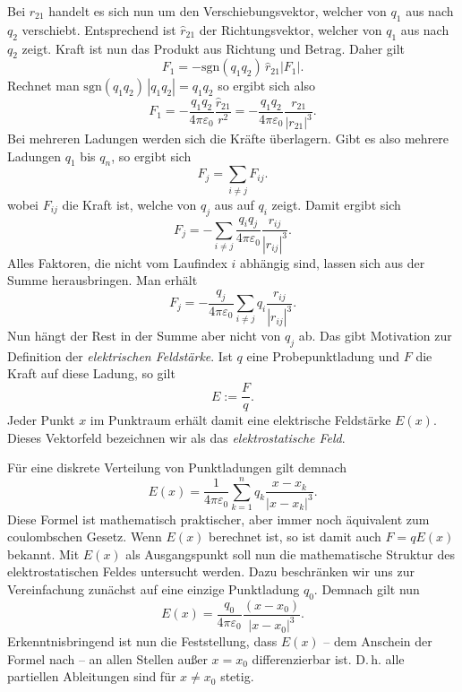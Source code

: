 \documentclass[a4paper,10pt,fleqn,twocolumn,twoside]{article}
\begin{document}
Bei $r_{21}$ handelt es sich nun um den Verschiebungsvektor,
welcher von $q_1$ aus nach $q_2$ verschiebt. Entsprechend
ist $\hat r_{21}$ der Richtungsvektor, welcher von $q_1$ aus
nach $q_2$ zeigt. Kraft ist nun das Produkt aus Richtung und
Betrag. Daher gilt
\[F_1=-\mathrm{sgn}(q_1q_2)\,\hat r_{21}|F_1|.\]
Rechnet man $\mathrm{sgn}(q_1q_2)\,|q_1q_2|=q_1q_2$ so ergibt sich
also
\[F_1=-\frac{q_1q_2}{4\pi\varepsilon_0}\frac{\hat r_{21}}{r^2}
=-\frac{q_1q_2}{4\pi\varepsilon_0}\frac{r_{21}}{|r_{21}|^3}.\]
Bei mehreren Ladungen werden sich die Kräfte überlagern. Gibt es
also mehrere Ladungen $q_1$ bis $q_n$, so ergibt sich
\[F_j = \sum_{i\ne j} F_{ij}.\]
wobei $F_{ij}$ die Kraft ist, welche von $q_j$ aus auf
$q_i$ zeigt. Damit ergibt sich
\[F_j = -\sum_{i\ne j} \frac{q_iq_j}{4\pi\varepsilon_0}
\frac{r_{ij}}{|r_{ij}|^3}.\]
Alles Faktoren, die nicht vom Laufindex $i$ abhängig sind, lassen
sich aus der Summe herausbringen. Man erhält
\[F_j = -\frac{q_j}{4\pi\varepsilon_0}
\sum_{i\ne j} q_i\frac{r_{ij}}{|r_{ij}|^3}.\]
Nun hängt der Rest in der Summe aber nicht von $q_j$ ab.
Das gibt Motivation zur Definition der \emph{elektrischen Feldstärke}.
Ist $q$ eine Probepunktladung und $F$ die Kraft auf diese Ladung,
so gilt
\[E := \frac{F}{q}.\]
Jeder Punkt $x$ im Punktraum erhält damit eine elektrische
Feldstärke $E(x)$. Dieses Vektorfeld bezeichnen wir als das
\emph{elektrostatische Feld}.

Für eine diskrete Verteilung von Punktladungen gilt demnach
\begin{equation}\label{eq:ESumme}
E(x) = \frac{1}{4\pi\varepsilon_0}
\sum_{k=1}^n q_k\frac{x-x_k}{|x-x_k|^3}.
\end{equation}
Diese Formel ist mathematisch praktischer, aber immer noch äquivalent
zum coulombschen Gesetz. Wenn $E(x)$ berechnet ist, so ist
damit auch $F=qE(x)$ bekannt. Mit $E(x)$ als Ausgangspunkt
soll nun die mathematische Struktur des elektrostatischen Feldes
untersucht werden. Dazu beschränken wir uns zur Vereinfachung
zunächst auf eine einzige Punktladung $q_0$. Demnach gilt nun
\begin{equation}\label{eq:E-Feld}
E(x) = \frac{q_0}{4\pi\varepsilon_0}\frac{(x-x_0)}{|x-x_0|^3}.
\end{equation}
Erkenntnisbringend ist nun die Feststellung, dass $E(x)$ --
dem Anschein der Formel nach -- an allen Stellen außer $x=x_0$
differenzierbar ist. D.\,h. alle partiellen Ableitungen sind
für $x\ne x_0$ stetig.
\end{document}
